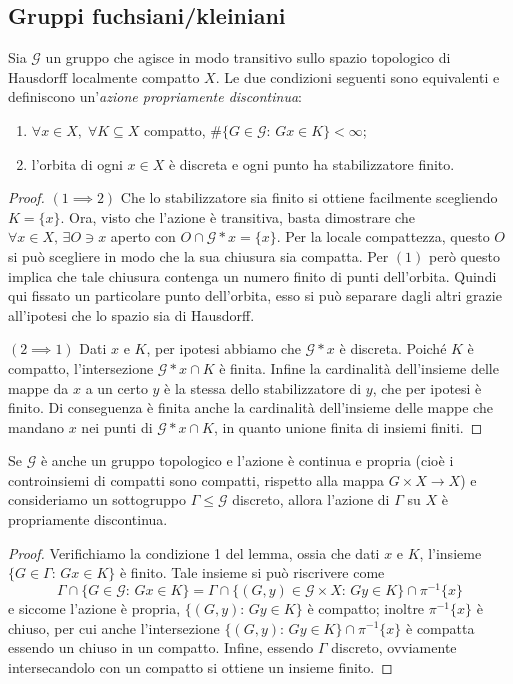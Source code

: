 \subsection{Gruppi fuchsiani/kleiniani}

\begin{lemma}
	Sia $\mathcal G$ un gruppo che agisce in modo transitivo sullo spazio topologico di Hausdorff localmente compatto $X$. Le due condizioni seguenti sono equivalenti e definiscono un'\emph{azione propriamente discontinua}:
	\begin{enumerate}
		\item $\forall x\in X,\;\forall K\subseteq X$ compatto, $\#\{G\in\mathcal G:\,Gx\in K\}<\infty$;
		\item l'orbita di ogni $x\in X$ è discreta e ogni punto ha stabilizzatore finito. 
	\end{enumerate}
\end{lemma}
\begin{proof}
	$(1\implies 2)$ Che lo stabilizzatore sia finito si ottiene facilmente scegliendo $K = \{x\}$. 
	Ora, visto che l'azione è transitiva, basta dimostrare che $\forall x\in X,\,\exists O\ni x$ aperto con $O\cap \mathcal G*x = \{x\}$.
	Per la locale compattezza, questo $O$ si può scegliere in modo che la sua chiusura sia compatta. Per $(1)$ però questo implica che tale chiusura contenga un numero finito di punti dell'orbita. Quindi qui fissato un particolare punto dell'orbita, esso si può separare dagli altri grazie all'ipotesi che lo spazio sia di Hausdorff. 
	
	$(2\implies1)$ Dati $x$ e $K$, per ipotesi abbiamo che $\mathcal G*x$ è discreta. Poiché $K$ è compatto, l'intersezione $\mathcal G*x\cap K$ è finita. Infine la cardinalità dell'insieme delle mappe da $x$ a un certo $y$ è la stessa dello stabilizzatore di $y$, che per ipotesi è finito. Di conseguenza è finita anche la cardinalità dell'insieme delle mappe che mandano $x$ nei punti di $\mathcal G*x\cap K$, in quanto unione finita di insiemi finiti.
\end{proof}

\begin{osservazione}
	Se $\mathcal G$ è anche un gruppo topologico e l'azione è continua e propria (cioè i controinsiemi di compatti sono compatti, rispetto alla mappa $G\times X\to X$) e consideriamo un sottogruppo $\Gamma\leq\mathcal G$ discreto, allora l'azione di $\Gamma$ su $X$ è propriamente discontinua. 
\end{osservazione}
\begin{proof}
	Verifichiamo la condizione 1 del lemma, ossia che dati $x$ e $K$, l'insieme $\{G\in\Gamma:\, Gx\in K\}$ è finito. 
	Tale insieme si può riscrivere come 
	$$\Gamma\cap \{G\in\mathcal G:\, Gx\in K\} = \Gamma \cap \{(G,y)\in\mathcal G\times X:\,Gy\in K\}\cap \pi^{-1}\{x\}$$
	e siccome l'azione è propria, $\{(G,y):\,Gy\in K\}$ è compatto; inoltre $\pi^{-1}\{x\}$ è chiuso, per cui anche l'intersezione $\{(G,y):\,Gy\in K\}\cap \pi^{-1}\{x\}$ è compatta essendo un chiuso in un compatto. Infine, essendo $\Gamma$ discreto, ovviamente intersecandolo con un compatto si ottiene un insieme finito.
\end{proof}

